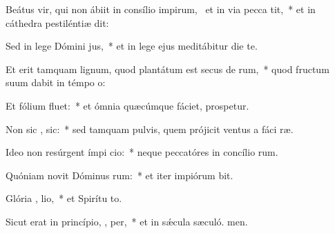 \item Beátus vir, qui non ábiit in consílio impirum,~\pscross{} et in via pecca  tit,~* et in cáthedra pestiléntiæ  dit:
\item Sed in lege Dómini  jus,~* et in lege ejus meditábitur die  te.
\item Et erit tamquam lignum, quod plantátum est secus de rum,~* quod fructum suum dabit in témpo o:
\item Et fólium   fluet:~* et ómnia quæcúmque fáciet, prospetur.
\item Non sic ,  sic:~* sed tamquam pulvis, quem prójicit ventus a fáci ræ.
\item Ideo non resúrgent ímpi  cio:~* neque peccatóres in concílio rum.
\item Quóniam novit Dóminus  rum:~* et iter impiórum bit.
\item Glória ,  lio,~* et Spirítu to.
\item Sicut erat in princípio,  ,  per,~* et in sǽcula sæculó. men.
